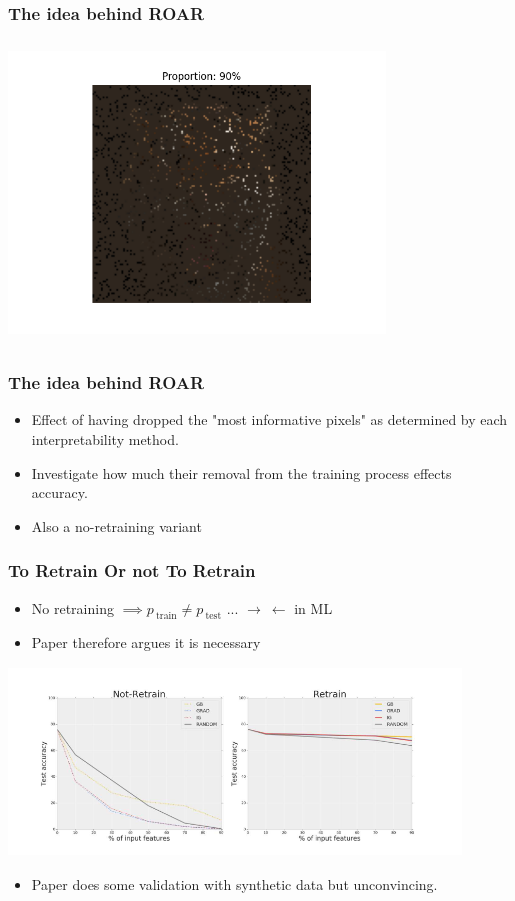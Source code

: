 \documentclass{beamer}
\theoremstyle{mystyle}
\begin{document}
\begin{frame}
	\frametitle{The idea behind ROAR}
	\includegraphics[height=8cm, width=10cm]{tiger0.9.png}

\end{frame}
\begin{frame}
	\frametitle{The idea behind ROAR}
	\begin{itemize}
		\item Effect of having dropped the "most informative pixels" as determined by each interpretability method.
		\item Investigate how much their removal from the training process effects accuracy.		
		\item Also a no-retraining variant
	\end{itemize}
\end{frame}
\begin{frame}
	\frametitle{To Retrain Or not To Retrain}
	\begin{itemize}
	\item No retraining  $\implies p_{\ \text{train}} \neq p_{ \ \text{test}}$ ... $\rightarrow \ \leftarrow$ in ML \pause
	\item Paper therefore argues it is necessary \pause
	\end{itemize}
	\includegraphics[width=12cm, height=5cm]{retrain_vs_not.png}\pause
	\begin{itemize}
	\item Paper does some validation with synthetic data but unconvincing.
	\end{itemize}
\end{frame}
\end{document}
